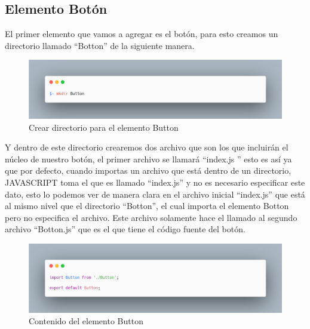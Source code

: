 \subsection{Elemento Botón}
El primer elemento que vamos a agregar es el botón, para esto creamos un directorio llamado “Botton” de la siguiente manera.
\newline
\newline
\begin{figure}[H]
    \includegraphics[width=1\textwidth]{./Imagenes/carbon-3.png}
    \caption[Crear directorio para el elemento Button]{Crear directorio para el elemento Button}
    \end{figure}
\newline
\newline
Y dentro de este directorio crearemos dos archivo que son los que incluirán el núcleo de nuestro botón, el primer archivo se llamará “index.js ” esto es así ya que por defecto, cuando importas un archivo que está dentro de un directorio, JAVASCRIPT toma el que es llamado “index.js” y no es necesario especificar este dato, esto lo podemos ver de manera clara en el archivo inicial “index.js” que está al mismo nivel que el directorio “Botton”, el cual importa el elemento Botton pero no especifica el archivo. Este archivo solamente hace el llamado al segundo archivo “Botton.js” que es el que tiene el código fuente del botón. 
\newline
\newline
\begin{figure}[H]
    \includegraphics[width=1\textwidth]{./Imagenes/carbon-5.png}
    \caption[Contenido del elemento Button]{Contenido del elemento Button}
    \end{figure}
\newline
\newline
